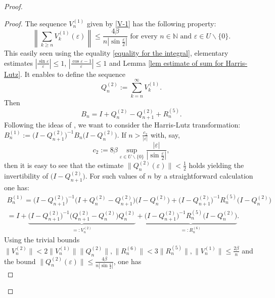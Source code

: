 \documentclass[a4paper,oneside,12pt]{amsart}
\begin{document}
\begin{proof}
\begin{proof}
The sequence $V^{(1)}_n$ given by \eqref{V-1} has the following property:
\begin{equation}\label{estimate of the sum of V-1}
    \left\|\sum_{k\ge n}V^{(1)}_k(\varepsilon)\right\|
    \le
    \frac{4\beta}{n\left|\sin\frac{\varepsilon}2\right|}
    \text{ for every }n\in\mathbb N\text{ and }\varepsilon\in U\backslash\{0\}.
\end{equation}
This easily seen using the equality \eqref{equality for the integral}, elementary estimates $\left|\frac{\sin\varepsilon}{\varepsilon}\right|\le1$, $\left|\frac{\cos\varepsilon-1}{\varepsilon}\right|\le1$ and Lemma \ref{lem estimate of sum for Harris-Lutz}. It enables to define the sequence
\begin{equation*}
    Q^{(2)}_n:=\sum_{k=n}^{\infty}V^{(1)}_k.
\end{equation*}
Then
\begin{equation*}
    B_n=I+Q^{(2)}_n-Q^{(2)}_{n+1}+R^{(5)}_n.
\end{equation*}
Following the ideas of \cite{Harris-Lutz-1975,Benzaid-Lutz-1987}, we want to consider the Harris-Lutz transformation: $B^{(1)}_n:=\bigl(I-Q^{(2)}_{n+1}\bigr)^{-1}B_n\bigl(I-Q^{(2)}_n\bigr)$. If $n>\frac{c_2}{|\varepsilon|}$ with, say,
\begin{equation}\label{c-2}
    c_2:=8\beta\sup\limits_{\varepsilon\in U\backslash\{0\}}\frac{|\varepsilon|}{\left|\sin\frac{\varepsilon}2\right|},
\end{equation}
then it is easy to see that the estimate $\|Q^{(2)}_n(\varepsilon)\|<\frac12$ holds yielding the invertibility of $\bigl(I-Q^{(2)}_{n+1}\bigr)$. For such values of $n$ by a straightforward calculation one has:
\begin{multline}\label{V-2,R-6}
    B^{(1)}_n=\bigl(I-Q^{(2)}_{n+1}\bigr)^{-1}\bigl(I+Q^{(2)}_n-Q^{(2)}_{n+1}\bigr)\bigl(I-Q^{(2)}_n\bigr)
    +\bigl(I-Q^{(2)}_{n+1}\bigr)^{-1}R^{(5)}_n\bigl(I-Q^{(2)}_n\bigr)
    \\
    =I+\underbrace{\bigl(I-Q^{(2)}_{n+1}\bigr)^{-1}\bigl(Q^{(2)}_{n+1}-Q^{(2)}_n\bigr)Q^{(2)}_n}_{=:V^{(2)}_n}
    +\underbrace{\bigl(I-Q^{(2)}_{n+1}\bigr)^{-1}R^{(5)}_n\bigl(I-Q^{(2)}_n\bigr)}_{=:R^{(6)}_n}.
\end{multline}
Using the trivial bounds $\|V^{(2)}_n\|<2\|V^{(1)}_n\|\|Q^{(2)}_n\|,\|R^{(6)}_n\|<3\|R^{(5)}_n\|,\|V^{(1)}_n\|\le\frac{2\beta}n$ and the bound $\|Q^{(2)}_n(\varepsilon)\|\le\frac{4\beta}{n\left|\sin\frac{\varepsilon}2\right|}$, one has
\begin{equation*}

\end{equation*}
\end{proof}
\end{proof}
\end{document}
